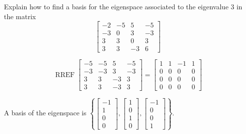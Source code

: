 
\begin{exerciseStatement}


Explain how to find a basis for the eigenspace associated to the eigenvalue \( 3 \) in the matrix \[ \left[\begin{array}{cccc}
-2 & -5 & 5 & -5 \\
-3 & 0 & 3 & -3 \\
3 & 3 & 0 & 3 \\
3 & 3 & -3 & 6
\end{array}\right] \]


\end{exerciseStatement}
    
\begin{exerciseAnswer} 


\[\operatorname{RREF} \left[\begin{array}{cccc}
-5 & -5 & 5 & -5 \\
-3 & -3 & 3 & -3 \\
3 & 3 & -3 & 3 \\
3 & 3 & -3 & 3
\end{array}\right] = \left[\begin{array}{cccc}
1 & 1 & -1 & 1 \\
0 & 0 & 0 & 0 \\
0 & 0 & 0 & 0 \\
0 & 0 & 0 & 0
\end{array}\right] \]



A basis of the eigenspace is \( \left\{ \left[\begin{array}{c}
-1 \\
1 \\
0 \\
0
\end{array}\right] , \left[\begin{array}{c}
1 \\
0 \\
1 \\
0
\end{array}\right] , \left[\begin{array}{c}
-1 \\
0 \\
0 \\
1
\end{array}\right] \right\} \).


\end{exerciseAnswer}
    
